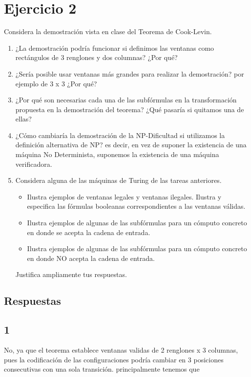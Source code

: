 \section{Ejercicio 2}


\begin{tcolorbox}[enunciado]
Considera la demostración vista en clase del Teorema de Cook-Levin.
\begin{enumerate}
    \item ¿La demostración podría funcionar si definimos las ventanas como rectángulos de 3 renglones y dos columnas? ¿Por qué?
    \item ¿Sería posible usar ventanas más grandes para realizar la demostración? por ejemplo de 3 x 3 ¿Por qué?
    \item ¿Por qué son necesarias cada una de las subfórmulas en la transformación propuesta en la demostración del teorema? ¿Qué pasaría si quitamos una de ellas?
    \item ¿Cómo cambiaría la demostración de la NP-Dificultad si utilizamos la definición alternativa de NP? es decir, en vez de suponer la existencia de una máquina No Determinista, suponemos la existencia de una máquina verificadora.
    \item Considera alguna de las máquinas de Turing de las tareas anteriores.
    \begin{itemize}
        \item Ilustra ejemplos de ventanas legales y ventanas ilegales. Ilustra y especifica las fórmulas booleanas correspondientes a las ventanas válidas.
        \item Ilustra ejemplos de algunas de las subfórmulas para un cómputo concreto en donde se acepta la cadena de entrada.
        \item Ilustra ejemplos de algunas de las subfórmulas para un cómputo concreto en donde NO acepta la cadena de entrada.
    \end{itemize}
    Justifica ampliamente tus respuestas.
\end{enumerate}
\end{tcolorbox}

\subsection*{Respuestas}
\subsection{1}
    No, ya que el teorema establece ventanas validas de 2 renglones x 3 columnas, pues la codificación de las configuraciones podría cambiar en 3 posiciones consecutivas con una sola transición. principalmente tenemos que\\ 
    
